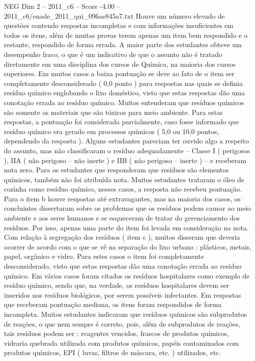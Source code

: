 \begin{textsample}{NEG Dim 2 – 2011\_c6 – Score -4.00 – 2011\_c6/enade\_2011\_qui\_096ae845a7.txt}
Houve um número elevado de questões contendo respostas incompletas e com informações insuficientes em todos os itens, além de muitas provas terem apenas um item bem respondido e o restante, respondido de forma errada.
A maior parte dos estudantes obteve um desempenho fraco, o que é um indicativo de que o assunto não é tratado diretamente em uma disciplina dos cursos de Química, na maioria dos cursos superiores.
Em muitos casos a baixa pontuação se deve ao fato de o item ser completamente desconsiderado ( 0,0 ponto ) para respostas nas quais se definia resíduo químico englobando o lixo doméstico, visto que estas respostas dão uma conotação errada ao resíduo químico.
Muitos entenderam que resíduos químicos são somente os materiais que são tóxicos para meio ambiente.
Para estas respostas, a pontuação foi considerada parcialmente, caso fosse informado que resíduo químico era gerado em processos químicos ( 5,0 ou 10,0 pontos, dependendo da resposta ).
Alguns estudantes pareciam ter ouvido algo a respeito do assunto, mas não classificaram o resíduo adequadamente – Classe I ( perigosos ), IIA ( não perigoso – não inerte ) e IIB ( não perigoso – inerte ) – e receberam nota zero.
Para os estudantes que responderam que resíduos são elementos químicos, também não foi atribuída nota.
Muitos estudantes trataram o óleo de cozinha como resíduo químico, nesses casos, a resposta não recebeu pontuação.
Para o item b houve respostas até extravagantes, mas na maioria dos casos, os concluintes dissertaram sobre os problemas que os resíduos podem causar ao meio ambiente e aos seres humanos e se esqueceram de tratar do gerenciamento dos resíduos.
Por isso, apenas uma parte do item foi levada em consideração na nota.
Com relação à segregação dos resíduos ( item c ), muitos disseram que deveria ocorrer de acordo com o que se vê na separação do lixo urbano : plásticos, metais, papel, orgânico e vidro.
Para estes casos o item foi completamente desconsiderado, visto que estas respostas dão uma conotação errada ao resíduo químico.
Em vários casos foram citados os resíduos hospitalares como exemplo de resíduo químico, sendo que, na verdade, os resíduos hospitalares devem ser inseridos nos resíduos biológicos, por serem possíveis infectantes.
Em respostas que receberam pontuação mediana, os itens foram respondidos de forma incompleta.
Muitos estudantes indicaram que resíduos químicos são subprodutos de reações, o que nem sempre é correto, pois, além de subprodutos de reações, tais resíduos podem ser : reagentes vencidos, frascos de produtos químicos, vidraria quebrada utilizada com produtos químicos, papéis contaminados com produtos químicos, EPI ( luvas, filtros de máscara, etc. ) utilizados, etc.

\end{textsample}
